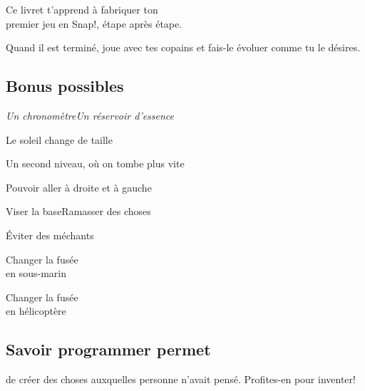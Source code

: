\documentclass[a7paper,pagesize,DIV=14,10pt]{scrbook}
\newcommand{\snap}{Snap!\xspace}
\begin{document}
Ce livret t'apprend à fabriquer ton \\
premier jeu en \snap, étape après étape.

\medskip
Quand il est terminé, joue avec tes copains et fais-le évoluer comme tu le
désires.

\vspace{-.3\baselineskip}
\subsection*{Bonus possibles}
\vspace{-.5\baselineskip}

{\it Un chronomètre\hfill Un réservoir d'essence

\smallskip
\centerline{Le soleil change de taille}

\smallskip
Un second niveau, où on tombe plus vite

\smallskip
\centerline{Pouvoir aller à droite et à gauche}

\smallskip
Viser la base\hfill Ramasser des choses

\smallskip
\centerline{Éviter des méchants}

\smallskip
\begin{minipage}{.5\linewidth}
  \center
  Changer la fusée\\
  en sous-marin
\end{minipage}%
\begin{minipage}{.5\linewidth}
  \center
  Changer la fusée\\
  en hélicoptère
\end{minipage}
}

\vspace{-.3\baselineskip}
\subsection*{Savoir programmer permet}
\vspace{-.7\baselineskip} %
de créer des choses auxquelles personne n'avait pensé. Profites-en pour
inventer!
\end{document}
